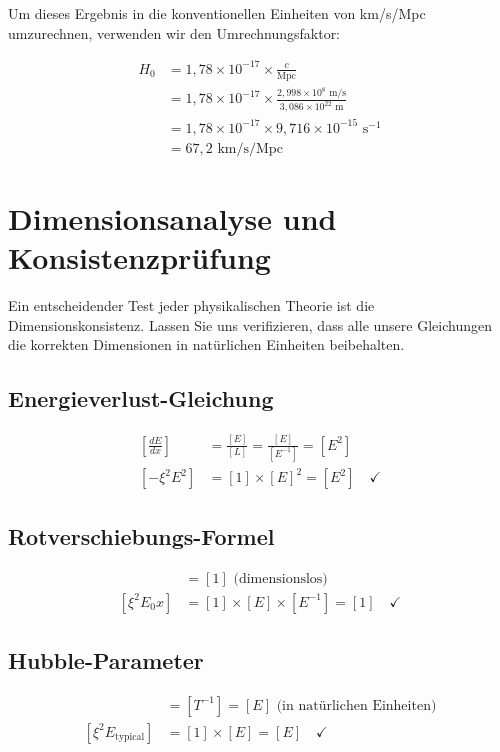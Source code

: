 \documentclass[12pt,a4paper]{article}
\begin{document}
	Um dieses Ergebnis in die konventionellen Einheiten von km/s/Mpc umzurechnen, verwenden wir den Umrechnungsfaktor:
	
	\begin{align}
		H_0 &= 1{,}78 \times 10^{-17} \times \frac{c}{\text{Mpc}} \\
		&= 1{,}78 \times 10^{-17} \times \frac{2{,}998 \times 10^8 \text{ m/s}}{3{,}086 \times 10^{22} \text{ m}} \\
		&= 1{,}78 \times 10^{-17} \times 9{,}716 \times 10^{-15} \text{ s}^{-1} \\
		&= 67{,}2 \text{ km/s/Mpc}
	\end{align}
	
	\section{Dimensionsanalyse und Konsistenzprüfung}
	
	Ein entscheidender Test jeder physikalischen Theorie ist die Dimensionskonsistenz. Lassen Sie uns verifizieren, dass alle unsere Gleichungen die korrekten Dimensionen in natürlichen Einheiten beibehalten.
	
	\subsection{Energieverlust-Gleichung}
	
	\begin{align}
		\left[\frac{dE}{dx}\right] &= \frac{[E]}{[L]} = \frac{[E]}{[E^{-1}]} = [E^2] \\
		\left[-\xi^2 E^2\right] &= [1] \times [E]^2 = [E^2] \quad \checkmark
	\end{align}
	
	\subsection{Rotverschiebungs-Formel}
	
	\begin{align}
		[z] &= [1] \text{ (dimensionslos)} \\
		[\xi^2 E_0 x] &= [1] \times [E] \times [E^{-1}] = [1] \quad \checkmark
	\end{align}
	
	\subsection{Hubble-Parameter}
	
	\begin{align}
		[H_0] &= [T^{-1}] = [E] \text{ (in natürlichen Einheiten)} \\
		[\xi^2 E_{\text{typical}}] &= [1] \times [E] = [E] \quad \checkmark
	\end{align}
	
\end{document}
